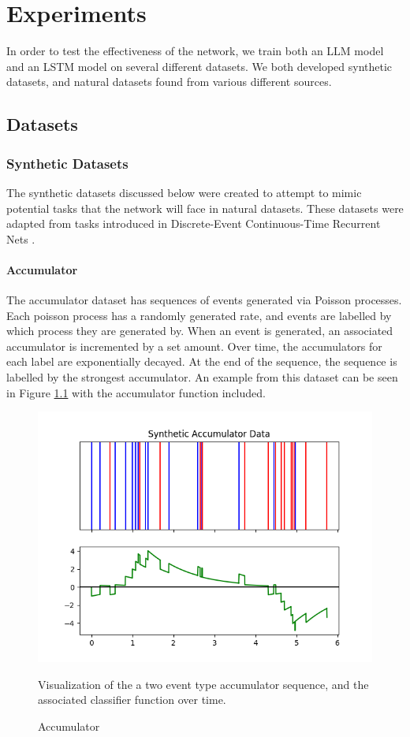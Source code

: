 \chapter{Experiments}
\label{expchap}
In order to test the effectiveness of the network, we train both an LLM model and an LSTM model on several different datasets. We both developed synthetic datasets, and natural datasets found from various different sources.
\section{Datasets}
\subsection{Synthetic Datasets}
The synthetic datasets discussed below were created to attempt to mimic potential tasks that the network will face in natural datasets. These datasets were adapted from tasks introduced in Discrete-Event Continuous-Time Recurrent Nets \cite{DECTRN}.
\subsubsection{Accumulator}
The accumulator dataset has sequences of events generated via Poisson processes. Each poisson process has a randomly generated rate, and events are labelled by which process they are generated by. When an event is generated, an associated accumulator is incremented by a set amount. Over time, the accumulators for each label are exponentially decayed. At the end of the sequence, the sequence is labelled by the strongest accumulator. An example from this dataset can be seen in Figure \ref{fig:accum} with the accumulator function included. 
\begin{figure}
    \centering
    \includegraphics{figures/accum1.png}
    \caption{Accumulator}
    \label{fig:accum}
    Visualization of the a two event type accumulator sequence, and the associated classifier function over time.
\end{figure}
